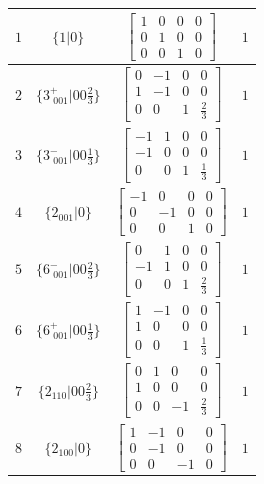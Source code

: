 \documentclass[fleqn,8pt]{jsarticle}
\begin{document}
\begin{longtable}{cccc}
$ 1 $ & $ \{1|0\} $ & $ \begin{bmatrix} 1 & 0 & 0 & 0 \\ 0 & 1 & 0 & 0 \\ 0 & 0 & 1 & 0 \end{bmatrix} $ & $ 1 $ \\ \hline
$ 2 $ & $ \{3^{+}_{\,\,001}|0 0 \frac{2}{3}\} $ & $ \begin{bmatrix} 0 & -1 & 0 & 0 \\ 1 & -1 & 0 & 0 \\ 0 & 0 & 1 & \frac{2}{3} \end{bmatrix} $ & $ 1 $ \\ \hline
$ 3 $ & $ \{3^{-}_{\,\,001}|0 0 \frac{1}{3}\} $ & $ \begin{bmatrix} -1 & 1 & 0 & 0 \\ -1 & 0 & 0 & 0 \\ 0 & 0 & 1 & \frac{1}{3} \end{bmatrix} $ & $ 1 $ \\ \hline
$ 4 $ & $ \{2{}_{001}|0\} $ & $ \begin{bmatrix} -1 & 0 & 0 & 0 \\ 0 & -1 & 0 & 0 \\ 0 & 0 & 1 & 0 \end{bmatrix} $ & $ 1 $ \\ \hline
$ 5 $ & $ \{6^{-}_{\,\,001}|0 0 \frac{2}{3}\} $ & $ \begin{bmatrix} 0 & 1 & 0 & 0 \\ -1 & 1 & 0 & 0 \\ 0 & 0 & 1 & \frac{2}{3} \end{bmatrix} $ & $ 1 $ \\ \hline
$ 6 $ & $ \{6^{+}_{\,\,001}|0 0 \frac{1}{3}\} $ & $ \begin{bmatrix} 1 & -1 & 0 & 0 \\ 1 & 0 & 0 & 0 \\ 0 & 0 & 1 & \frac{1}{3} \end{bmatrix} $ & $ 1 $ \\ \hline
$ 7 $ & $ \{2{}_{110}|0 0 \frac{2}{3}\} $ & $ \begin{bmatrix} 0 & 1 & 0 & 0 \\ 1 & 0 & 0 & 0 \\ 0 & 0 & -1 & \frac{2}{3} \end{bmatrix} $ & $ 1 $ \\ \hline
$ 8 $ & $ \{2{}_{100}|0\} $ & $ \begin{bmatrix} 1 & -1 & 0 & 0 \\ 0 & -1 & 0 & 0 \\ 0 & 0 & -1 & 0 \end{bmatrix} $ & $ 1 $ \\ \hline

\end{longtable}
\end{document}
